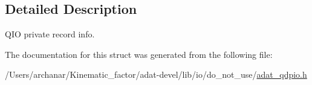 \subsection{Detailed Description}
Q\+IO private record info. 

The documentation for this struct was generated from the following file\+:\begin{DoxyCompactItemize}
\item 
/\+Users/archanar/\+Kinematic\+\_\+factor/adat-\/devel/lib/io/do\+\_\+not\+\_\+use/\mbox{\hyperlink{adat-devel_2lib_2io_2do__not__use_2adat__qdpio_8h}{adat\+\_\+qdpio.\+h}}\end{DoxyCompactItemize}

